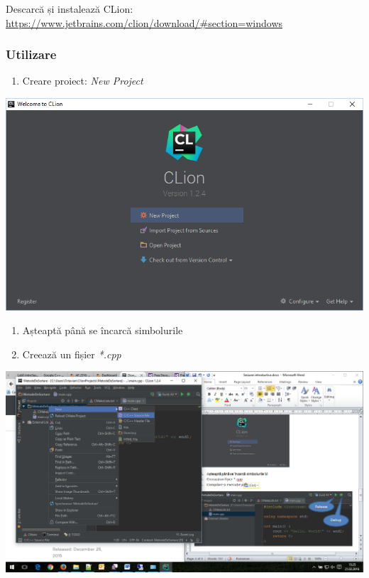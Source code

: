 \documentclass[../ro-fa-lab.tex]{subfiles}
\begin{document}
Descarcă și instalează CLion:
\url{https://www.jetbrains.com/clion/download/\#section=windows}

\subsubsection{Utilizare}\label{utilizare-1}

\begin{enumerate}
\def\labelenumi{\arabic{enumi}.}
\item
  Creare proiect: \emph{New Project}
\end{enumerate}

\includegraphics[width=\textwidth]{../Resources/lab0/image8.png}

\begin{enumerate}
\def\labelenumi{\arabic{enumi}.}
\setcounter{enumi}{1}
\item
  Așteaptă până se încarcă simbolurile
\item
  Creează un fișier \emph{*.cpp}
\end{enumerate}

\includegraphics[width=\textwidth]{../Resources/lab0/image9.png}
\end{document}
